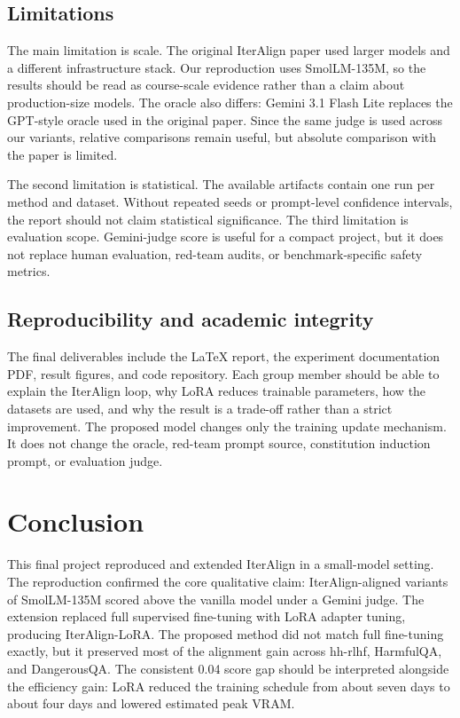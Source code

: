 \documentclass[10pt,twocolumn]{article}
\newcommand{\method}{IterAlign-LoRA}
\newcommand{\modelname}{SmolLM-135M}
\newcommand{\dataset}{DangerousQA}
\begin{document}
\subsection{Limitations}
The main limitation is scale. The original IterAlign paper used larger models and a different infrastructure stack. Our reproduction uses \modelname{}, so the results should be read as course-scale evidence rather than a claim about production-size models. The oracle also differs: Gemini 3.1 Flash Lite replaces the GPT-style oracle used in the original paper. Since the same judge is used across our variants, relative comparisons remain useful, but absolute comparison with the paper is limited.

The second limitation is statistical. The available artifacts contain one run per method and dataset. Without repeated seeds or prompt-level confidence intervals, the report should not claim statistical significance. The third limitation is evaluation scope. Gemini-judge score is useful for a compact project, but it does not replace human evaluation, red-team audits, or benchmark-specific safety metrics.

\subsection{Reproducibility and academic integrity}
The final deliverables include the LaTeX report, the experiment documentation PDF, result figures, and code repository. Each group member should be able to explain the IterAlign loop, why LoRA reduces trainable parameters, how the datasets are used, and why the result is a trade-off rather than a strict improvement. The proposed model changes only the training update mechanism. It does not change the oracle, red-team prompt source, constitution induction prompt, or evaluation judge.

\section{Conclusion}
\label{sec:conclusion}

This final project reproduced and extended IterAlign in a small-model setting. The reproduction confirmed the core qualitative claim: IterAlign-aligned variants of \modelname{} scored above the vanilla model under a Gemini judge. The extension replaced full supervised fine-tuning with LoRA adapter tuning, producing \method{}. The proposed method did not match full fine-tuning exactly, but it preserved most of the alignment gain across hh-rlhf, HarmfulQA, and \dataset{}. The consistent 0.04 score gap should be interpreted alongside the efficiency gain: LoRA reduced the training schedule from about seven days to about four days and lowered estimated peak VRAM.
\end{document}
